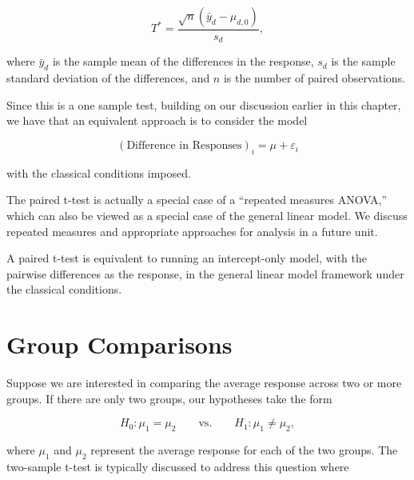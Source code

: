 \documentclass[
  letterpaper,
  DIV=11,
  numbers=noendperiod]{scrreprt}
\theoremstyle{definition}
\theoremstyle{definition}
\theoremstyle{remark}
\begin{document}
\[T^* = \frac{\sqrt{n}\left(\bar{y}_d - \mu_{d,0}\right)}{s_d},\]

where \(\bar{y}_d\) is the sample mean of the differences in the
response, \(s_d\) is the sample standard deviation of the differences,
and \(n\) is the number of paired observations.

Since this is a one sample test, building on our discussion earlier in
this chapter, we have that an equivalent approach is to consider the
model

\[(\text{Difference in Responses})_i = \mu + \varepsilon_i\]

with the classical conditions imposed.

The paired t-test is actually a special case of a ``repeated measures
ANOVA,'' which can also be viewed as a special case of the general
linear model. We discuss repeated measures and appropriate approaches
for analysis in a future unit.

\begin{tcolorbox}[enhanced jigsaw, left=2mm, toprule=.15mm, arc=.35mm, breakable, opacitybacktitle=0.6, opacityback=0, rightrule=.15mm, colbacktitle=quarto-callout-tip-color!10!white, coltitle=black, leftrule=.75mm, toptitle=1mm, colframe=quarto-callout-tip-color-frame, titlerule=0mm, title=\textcolor{quarto-callout-tip-color}{\faLightbulb}\hspace{0.5em}{Big Idea}, bottomrule=.15mm, colback=white, bottomtitle=1mm]

A paired t-test is equivalent to running an intercept-only model, with
the pairwise differences as the response, in the general linear model
framework under the classical conditions.

\end{tcolorbox}

\hypertarget{group-comparisons}{%
\section{Group Comparisons}\label{group-comparisons}}

Suppose we are interested in comparing the average response across two
or more groups. If there are only two groups, our hypotheses take the
form

\[H_0: \mu_1 = \mu_2 \qquad \text{vs.} \qquad H_1: \mu_1 \neq \mu_2,\]

where \(\mu_1\) and \(\mu_2\) represent the average response for each of
the two groups. The two-sample t-test is typically discussed to address
this question where
\end{document}
